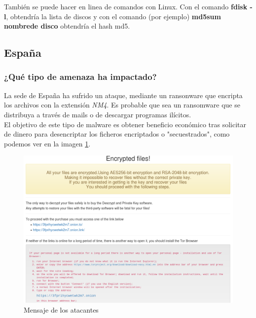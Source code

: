 \documentclass[12pt,twoside]{article}
\begin{document}
También se puede hacer en linea de comandos con Linux. Con el comando \textbf{fdisk -l}, obtendría la lista de discos y con el comando (por ejemplo) \textbf{md5sum nombre\textunderscore de \textunderscore disco} obtendría el hash md5. 



\subsection{España}
\subsubsection*{¿Qué tipo de amenaza ha impactado?}
La sede de España ha sufrido un ataque, mediante un ransonware que encripta los archivos con la extensión \textit{NM4}. Es probable que sea un ransomware que se distribuya a través de mails o de descargar programas ilícitos. \\
El objetivo de este tipo de malware es obtener beneficio económico tras solicitar de dinero para desencriptar los ficheros encriptados o "secuestrados", como podemos ver en la imagen \ref{amenaza}.

\begin{figure}
    \centering
    \includegraphics[scale=0.5]{./imagenes/spain_recover_files_message (1)}
    \caption{Mensaje de los atacantes}
    \label{amenaza}
\end{figure}
\end{document}
